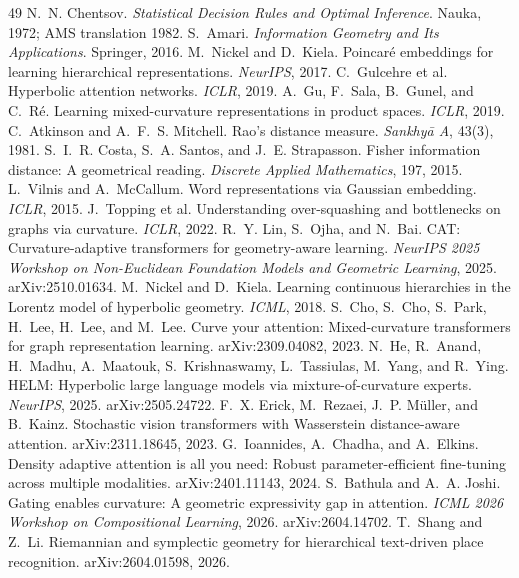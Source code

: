 \documentclass[11pt]{article}
\begin{document}
\begin{thebibliography}{49}
 N.~N. Chentsov. \emph{Statistical Decision Rules and Optimal Inference}. Nauka, 1972; AMS translation 1982.
 S.~Amari. \emph{Information Geometry and Its Applications}. Springer, 2016.
 M.~Nickel and D.~Kiela. Poincar\'e embeddings for learning hierarchical representations. \emph{NeurIPS}, 2017.
 C.~Gulcehre et al. Hyperbolic attention networks. \emph{ICLR}, 2019.
 A.~Gu, F.~Sala, B.~Gunel, and C.~R\'e. Learning mixed-curvature representations in product spaces. \emph{ICLR}, 2019.
 C.~Atkinson and A.~F.~S. Mitchell. Rao's distance measure. \emph{Sankhy\=a A}, 43(3), 1981.
 S.~I.~R. Costa, S.~A. Santos, and J.~E. Strapasson. Fisher information distance: A geometrical reading. \emph{Discrete Applied Mathematics}, 197, 2015.
 L.~Vilnis and A.~McCallum. Word representations via Gaussian embedding. \emph{ICLR}, 2015.
 J.~Topping et al. Understanding over-squashing and bottlenecks on graphs via curvature. \emph{ICLR}, 2022.
 R.~Y. Lin, S.~Ojha, and N.~Bai. CAT: Curvature-adaptive transformers for geometry-aware learning. \emph{NeurIPS 2025 Workshop on Non-Euclidean Foundation Models and Geometric Learning}, 2025. arXiv:2510.01634.
 M.~Nickel and D.~Kiela. Learning continuous hierarchies in the Lorentz model of hyperbolic geometry. \emph{ICML}, 2018.
 S.~Cho, S.~Cho, S.~Park, H.~Lee, H.~Lee, and M.~Lee. Curve your attention: Mixed-curvature transformers for graph representation learning. arXiv:2309.04082, 2023.
 N.~He, R.~Anand, H.~Madhu, A.~Maatouk, S.~Krishnaswamy, L.~Tassiulas, M.~Yang, and R.~Ying. HELM: Hyperbolic large language models via mixture-of-curvature experts. \emph{NeurIPS}, 2025. arXiv:2505.24722.
 F.~X. Erick, M.~Rezaei, J.~P. M\"uller, and B.~Kainz. Stochastic vision transformers with Wasserstein distance-aware attention. arXiv:2311.18645, 2023.
 G.~Ioannides, A.~Chadha, and A.~Elkins. Density adaptive attention is all you need: Robust parameter-efficient fine-tuning across multiple modalities. arXiv:2401.11143, 2024.
 S.~Bathula and A.~A. Joshi. Gating enables curvature: A geometric expressivity gap in attention. \emph{ICML 2026 Workshop on Compositional Learning}, 2026. arXiv:2604.14702.
 T.~Shang and Z.~Li. Riemannian and symplectic geometry for hierarchical text-driven place recognition. arXiv:2604.01598, 2026.

\end{thebibliography}
\end{document}
